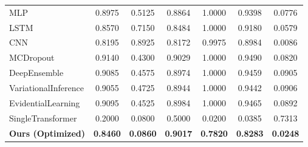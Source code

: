\begin{table*}[htbp]
\begin{tabular}{l|ccccc|c}
MLP & 0.8975 & 0.5125 & 0.8864 & 1.0000 & 0.9398 & 0.0776 \\
LSTM & 0.8570 & 0.7150 & 0.8484 & 1.0000 & 0.9180 & 0.0579 \\
CNN & 0.8195 & 0.8925 & 0.8172 & 0.9975 & 0.8984 & 0.0086 \\
MCDropout & 0.9140 & 0.4300 & 0.9029 & 1.0000 & 0.9490 & 0.0820 \\
DeepEnsemble & 0.9085 & 0.4575 & 0.8974 & 1.0000 & 0.9459 & 0.0905 \\
VariationalInference & 0.9055 & 0.4725 & 0.8944 & 1.0000 & 0.9442 & 0.0906 \\
EvidentialLearning & 0.9095 & 0.4525 & 0.8984 & 1.0000 & 0.9465 & 0.0892 \\
SingleTransformer & 0.2000 & 0.0800 & 0.5000 & 0.0200 & 0.0385 & 0.7313 \\
\textbf{Ours (Optimized)} & \textbf{0.8460} & \textbf{0.0860} & \textbf{0.9017} & \textbf{0.7820} & \textbf{0.8283} & \textbf{0.0248} \\
\hline
\end{tabular}
\end{table*}